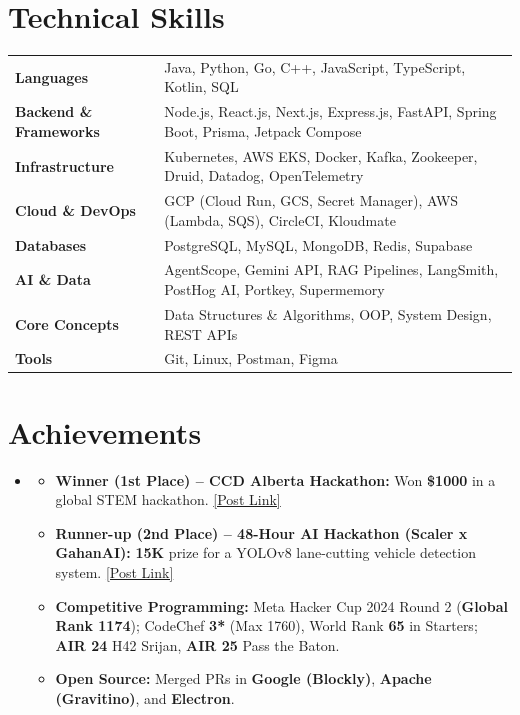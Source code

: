 \documentclass[A4,10pt]{article}
\newcommand{\hrefuline}[2]{%
  \href{#1}{#2\llap{\textcolor{linkgray}{\underline{\phantom{#2}}}}}%
}
\newcommand{\resumeItem}[1]{
  \item\small{#1 \vspace{-2pt}}
}
\newcommand{\resumeSubHeadingListStart}{\begin{itemize}[leftmargin=0.0in, label={}]}
\newcommand{\resumeSubHeadingListEnd}{\end{itemize}}
\newcommand{\resumeItemListStart}{\begin{itemize}[leftmargin=0.15in]}
\newcommand{\resumeItemListEnd}{\end{itemize}\vspace{-5pt}}
\begin{document}
\section{Technical Skills}
\begin{itemize}[leftmargin=0.0in, label={}]
\small{\item{
\begin{tabular}{@{}l@{\hspace{1.5em}}l}
  \textbf{Languages}              & Java, Python, Go, C++, JavaScript, TypeScript, Kotlin, SQL \\[3pt]
  \textbf{Backend \& Frameworks}  & Node.js, React.js, Next.js, Express.js, FastAPI, Spring Boot, Prisma, Jetpack Compose \\[3pt]
  \textbf{Infrastructure}         & Kubernetes, AWS EKS, Docker, Kafka, Zookeeper, Druid, Datadog, OpenTelemetry \\[3pt]
  \textbf{Cloud \& DevOps}        & GCP (Cloud Run, GCS, Secret Manager), AWS (Lambda, SQS), CircleCI, Kloudmate \\[3pt]
  \textbf{Databases}              & PostgreSQL, MySQL, MongoDB, Redis, Supabase \\[3pt]
  \textbf{AI \& Data}             & AgentScope, Gemini API, RAG Pipelines, LangSmith, PostHog AI, Portkey, Supermemory \\[3pt]
  \textbf{Core Concepts}          & Data Structures \& Algorithms, OOP, System Design, REST APIs \\[3pt]
  \textbf{Tools}                  & Git, Linux, Postman, Figma \\
\end{tabular}
}}
\end{itemize}

\section{Achievements}
\resumeSubHeadingListStart
  \item
  \resumeItemListStart
    \resumeItem{\textbf{Winner (1st Place) -- CCD Alberta Hackathon:} Won \textbf{\$1000} in a global STEM hackathon. \hrefuline{https://www.linkedin.com/posts/brainstem-alliance_stem-stemeducation-stemcareers-activity-7405048889361350656-Z2o3}{[Post Link]}}
    \resumeItem{\textbf{Runner-up (2nd Place) -- 48-Hour AI Hackathon (Scaler x GahanAI):} \textbf{\rupee 15K} prize for a YOLOv8 lane-cutting vehicle detection system. \hrefuline{https://www.linkedin.com/posts/vishesh-paliwal-42764b2ab_hackathon-ai-studentlife-activity-7342060751290814465-w4y9}{[Post Link]}}
    \resumeItem{\textbf{Competitive Programming:} Meta Hacker Cup 2024 Round 2 (\textbf{Global Rank 1174}); CodeChef \textbf{3*} (Max 1760), World Rank \textbf{65} in Starters; \textbf{AIR 24} H42 Srijan, \textbf{AIR 25} Pass the Baton.}
    \resumeItem{\textbf{Open Source:} Merged PRs in \textbf{Google (Blockly)}, \textbf{Apache (Gravitino)}, and \textbf{Electron}.}
  \resumeItemListEnd
\resumeSubHeadingListEnd
\end{document}
